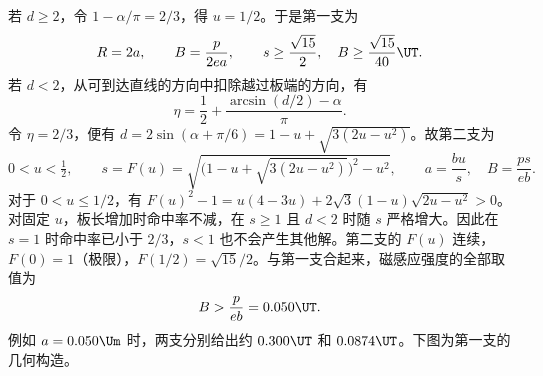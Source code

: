 \documentclass[\gkver]{gaokaozhenti}
\begin{document}
\begin{enumerate}
{若 $d\geq2$，令 $1-\alpha/\pi=2/3$，得 $u=1/2$。于是第一支为
\[
 R=2a,\qquad B=\frac{p}{2ea},\qquad s\geq\frac{\sqrt{15}}{2},
 \quad B\geq\frac{\sqrt{15}}{40}\UT .
\]
若 $d<2$，从可到达直线的方向中扣除越过板端的方向，有
\[
 \eta=\frac12+\frac{\arcsin(d/2)-\alpha}{\pi}.
\]
令 $\eta=2/3$，便有 $d=2\sin(\alpha+\pi/6)=1-u+\sqrt{3(2u-u^2)}$。故第二支为
\[
 0<u<\tfrac12,\qquad s=F(u)=
 \sqrt{\bigl(1-u+\sqrt{3(2u-u^2)}\bigr)^2-u^2},
 \qquad a=\frac{bu}{s},\quad B=\frac{ps}{eb}.
\]
对于 $0<u\leq1/2$，有
$F(u)^2-1=u(4-3u)+2\sqrt{3}(1-u)\sqrt{2u-u^2}>0$。
对固定 $u$，板长增加时命中率不减，在 $s\geq1$ 且 $d<2$ 时随 $s$ 严格增大。因此在 $s=1$ 时命中率已小于 $2/3$，$s<1$ 也不会产生其他解。第二支的 $F(u)$ 连续，$F(0)=1$（极限），$F(1/2)=\sqrt{15}/2$。与第一支合起来，磁感应强度的全部取值为
\[
 B>\frac{p}{eb}=0.050\UT .
\]
例如 $a=0.050\Um$ 时，两支分别给出约 $0.300\UT$ 和 $0.0874\UT$。下图为第一支的几何构造。

}

\end{enumerate}
\end{document}
